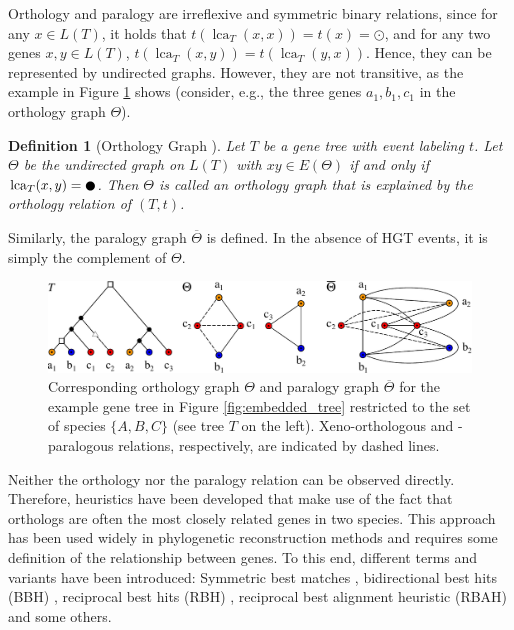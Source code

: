 \documentclass[hidelinks,11pt]{scrreprt}
\DeclareMathOperator{\lca}{lca}
\newtheorem{definition}[theorem]{Definition}
\newcommand{\LEAF}{\odot}
\newcommand{\SPEC}{\newmoon}
\begin{document}
Orthology and paralogy are irreflexive and symmetric binary relations, since for any $x\in L(T)$, it holds that $t(\lca_T(x,x))=t(x)=\LEAF$, and for any two genes $x,y\in L(T)$, $t(\lca_T(x,y)) = t(\lca_T(y,x))$. Hence, they can be represented by undirected graphs. However, they are not transitive, as the example in Figure \ref{fig:ortho_para_example} shows (consider, e.g., the three genes $a_1,b_1,c_1$ in the orthology graph $\Theta$).
\begin{definition}[Orthology Graph {\citep[Def. 5 mod.]{geiss2020c}}]
	Let $T$ be a gene tree with event labeling $t$. Let $\Theta$ be the undirected graph on $L(T)$ with $xy \in E(\Theta)$ if and only if $\lca_T(x,y)=\SPEC$. Then $\Theta$ is called an \emph{orthology graph} that is explained by the orthology relation of $(T,t)$.
\end{definition}
Similarly, the paralogy graph $\overline{\Theta}$ is defined. In the absence of HGT events, it is simply the complement of $\Theta$.

\vspace{5mm}
\begin{figure}[H]
	\begin{center}     
		\includegraphics[width=\columnwidth]{ortho_para_example.pdf}
	\end{center}
	\caption[Example orthology graph $\Theta$ and paralogy graph $\overline{\Theta}$]{Corresponding orthology graph $\Theta$ and paralogy graph $\overline{\Theta}$ for the example gene tree in Figure \ref{fig:embedded_tree} restricted to the set of species $\{A,B,C\}$ (see tree $T$ on the left). Xeno-orthologous and \mbox{-paralogous} relations, respectively, are indicated by dashed lines.}
	\label{fig:ortho_para_example}
\end{figure}

Neither the orthology nor the paralogy relation can be observed directly. Therefore, heuristics have been developed that make use of the fact that orthologs are often the most closely related genes in two species. This approach has been used widely in phylogenetic reconstruction methods and requires some definition of the relationship between genes. To this end, different terms and variants have been introduced: Symmetric best matches \citep[e.g. used by][]{tatusov1997}, bidirectional best hits (BBH) \citep[e.g.][]{overbeek1999,lafond2018}, reciprocal best hits (RBH) \citep[e.g.][]{bork1998}, reciprocal best alignment heuristic (RBAH) \citep[e.g.][]{lechner2011} and some others.
\end{document}
